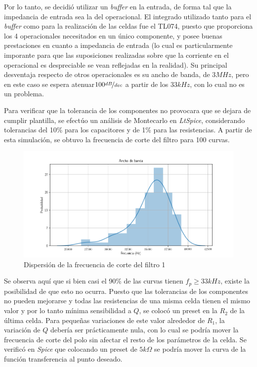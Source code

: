 \documentclass[../../tc_tp5_main.tex]{subfiles}
\begin{document}
Por lo tanto, se decidi\'o utilizar un \textit{buffer} en la entrada, de forma tal que la impedancia de entrada sea la del operacional. El integrado utilizado tanto para el \textit{buffer} como para la realizaci\'on de las celdas fue el TL074, puesto que proporciona los 4 operacionales necesitados en un \'unico componente, y posee buenas prestaciones en cuanto a impedancia de entrada (lo cual es particularmente imporante para que las suposiciones realizadas sobre que la corriente en el operacional es despreciable se vean reflejadas en la realidad). Su principal desventaja respecto de otros operacionales es su ancho de banda, de $3MHz$, pero en este caso se espera atenuar$100\nicefrac{dB}{dec}$ a partir de los $33kHz$, con lo cual no es un problema. \par

Para verificar que la tolerancia de los componentes no provocara que se dejara de cumplir plantilla, se efect\'uo un an\'alisis de Montecarlo en \textit{LtSpice}, considerando tolerancias del 10\% para los capacitores y de 1\% para las resistencias. A partir de esta simulaci\'on, se obtuvo la frecuencia de corte del filtro para 100 curvas.

\begin{figure}[H]
	\centering
	\includegraphics[scale=0.7]{imagenes/leg_hist_bw.png}
	\caption{Dispersi\'on de la frecuencia de corte del filtro 1}
\end{figure}

Se observa aqu\'i que si bien casi el 90\% de las curvas tienen $f_p \geq 33kHz$, existe la posibilidad de que esto no ocurra. Puesto que las tolerancias de los componentes no pueden mejorarse y todas las resistencias de una misma celda tienen el mismo valor y por lo tanto m\'inima sensibilidad a $Q$, se coloc\'o un preset en la $R_2$ de la \'ultima celda. Para peque\~nas variaciones de este valor alrededor de $R_1$, la variaci\'on de $Q$ deber\'ia ser pr\'acticamente nula, con lo cual se podr\'ia mover la frecuencia de corte del polo sin afectar el resto de los par\'ametros de la celda. Se verific\'o en \textit{Spice} que colocando un preset de $5k\Omega$ se podr\'ia mover la curva de la funci\'on transferencia al punto deseado.
\end{document}
